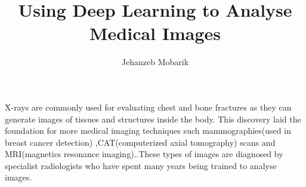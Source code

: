 \documentclass{report}
\title{Using Deep Learning to Analyse Medical Images}
\author{Jehanzeb Mobarik}
\begin{document}
	
\maketitle

















\iffalse
It was hypothesised that we can use a deep neural network approach to learn visual features directly without manual definitions. Fully connected neural networks can be used to extract features from an image taking in a vector of pixel values . This vector is fed into a network where each hidden layer node is connected to the inputs. However, by doing this we are squashing every pixel into a hidden node losing all spatial information in an image. Since images have rich structure a method needed to be found so that this spatial structure can be preserved. One way we can preserve the structure is to connect patches of the input to a hidden node. Not only does this reduce parameters for the network, it preserves pixels which are in the same region of the image as these pixels are usually related to each other. This is achieved by sliding a filter over a patch of the image and applying a convolution operation. This patch needs to be of the same dimensions as the filter and is applied over the whole image. The filter used for the convolution operation is iteratively learnt so that the correct feature can be extracted. Multiple filters can be learnt to extract different features from an image and this can be achieved by having multiple convolutional layers. Moreover filters in lower conv-layers usually describe simple textures, whereas filter in high-conv layers are more likely to represent object parts.
\fi


\iffalse
X-rays are commonly used for evaluating chest and bone fractures as they can generate images of tissues and structures inside the body. This discovery laid the foundation for more medical imaging techniques such mammographies(used in breast cancer detection) ,CAT(computerized axial tomography) scans and MRI(magnetics resonance imaging).\cite{bradley2008history}.These types of images are diagnosed by specialist radiologists who have spent many years being trained to analyse images.
\end{document}
